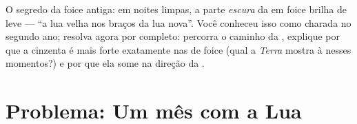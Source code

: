 \begin{exercise}[$\star\star\star$]\label{exo:g7:moon-phases:12}
O segredo da foice antiga: em noites limpas, a parte \emph{escura} da
 em foice brilha de leve --- ``a lua velha nos braços da lua
nova''. Você conheceu isso como charada no segundo ano; resolva agora
por completo: percorra o caminho da , explique por que a 
cinzenta é mais forte exatamente nas  de foice (qual  a
\emph{Terra} mostra à  nesses momentos?) e por que ela some na
direção da .
\end{exercise}

\section{Problema: Um mês com a Lua}

